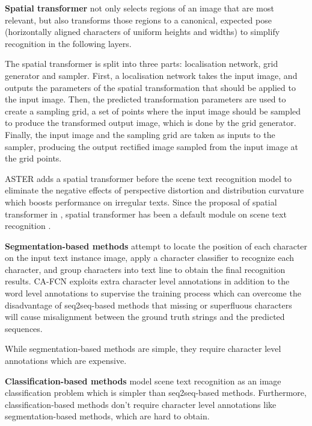 \documentclass[final]{cvpr}
\begin{document}
\textbf{Spatial transformer} \cite{jaderberg2015spatial} not only selects regions of an image that are most relevant, but also transforms those regions to a canonical, expected pose (horizontally aligned characters of uniform heights and widths) to simplify recognition in the following layers.

The spatial transformer is split into three parts: localisation network, grid generator and sampler. First, a localisation network takes the input image, and outputs the parameters of the spatial transformation that should be applied to the input image. Then, the predicted transformation parameters are used to create a sampling grid, a set of points where the input image should be sampled to produce the transformed output image, which is done by the grid generator. Finally, the input image and the sampling grid are taken as inputs to the sampler, producing the output rectified image sampled from the input image at the grid points.

ASTER \cite{shi2018aster} adds a spatial transformer before the scene text recognition model to eliminate the negative effects of perspective distortion and distribution curvature which boosts performance on irregular texts. Since the proposal of spatial transformer in \cite{liu2016star}, spatial transformer has been a default module  on scene text recognition \cite{shi2016robust, gao2018recurrent, shi2018aster, yang2019symmetry, zhan2019esir, hu2020gtc, litman2020scatter, qiao2020seed}.

\textbf{Segmentation-based methods} attempt to locate the position of each character on the input text instance image, apply a character classifier to recognize each character, and group characters into text line to obtain the final recognition results. CA-FCN \cite{liao2019scene} exploits extra character level annotations in addition to the word level annotations to supervise the training process which can overcome the disadvantage of seq2seq-based methods that missing or superfluous characters will cause misalignment between the ground truth strings and the predicted sequences.

While segmentation-based methods are simple, they require character level annotations which are expensive.

\textbf{Classification-based methods} model scene text recognition as an image classification problem which is simpler than seq2seq-based methods. Furthermore, classification-based methods don't require character level annotations like segmentation-based methods, which are hard to obtain.
\end{document}
